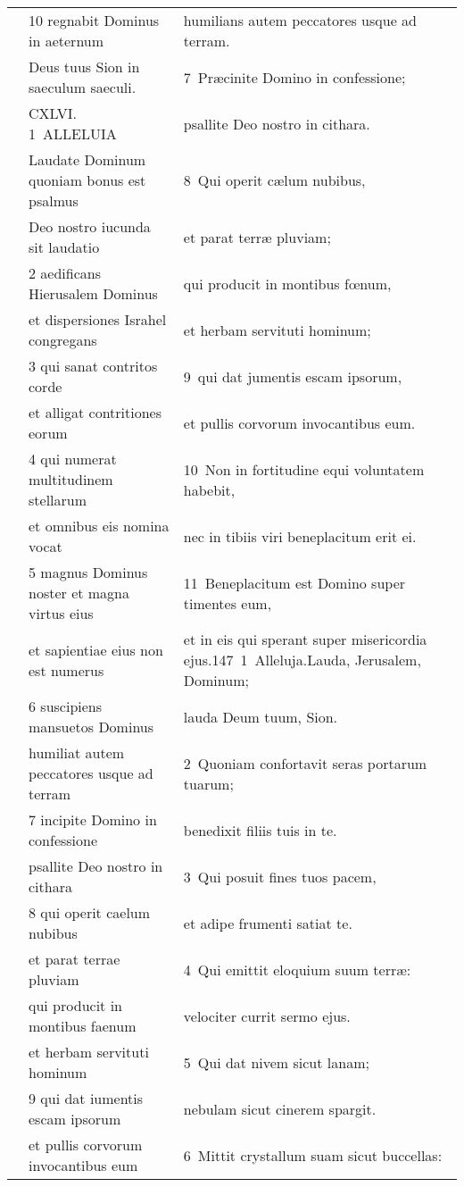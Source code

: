 \documentclass{article}
\begin{document}
\begin{longtable}{@{}p{}p{}p{}@{}}
	&	10 regnabit Dominus in aeternum	&	humilians autem peccatores usque ad terram.	\\
	&	Deus tuus Sion in saeculum saeculi.	&	7 Præcinite Domino in confessione;	\\
	&	CXLVI. 1 ALLELUIA	&	psallite Deo nostro in cithara.	\\
	&	Laudate Dominum quoniam bonus est psalmus	&	8 Qui operit cælum nubibus,	\\
	&	Deo nostro iucunda sit laudatio	&	et parat terræ pluviam;	\\
	&	2 aedificans Hierusalem Dominus	&	qui producit in montibus fœnum,	\\
	&	et dispersiones Israhel congregans	&	et herbam servituti hominum;	\\
	&	3 qui sanat contritos corde	&	9 qui dat jumentis escam ipsorum,	\\
	&	et alligat contritiones eorum	&	et pullis corvorum invocantibus eum.	\\
	&	4 qui numerat multitudinem stellarum	&	10 Non in fortitudine equi voluntatem habebit,	\\
	&	et omnibus eis nomina vocat	&	nec in tibiis viri beneplacitum erit ei.	\\
	&	5 magnus Dominus noster et magna virtus eius	&	11 Beneplacitum est Domino super timentes eum,	\\
	&	et sapientiae eius non est numerus	&	et in eis qui sperant super misericordia ejus.147 1 Alleluja.Lauda, Jerusalem, Dominum;	\\
	&	6 suscipiens mansuetos Dominus	&	lauda Deum tuum, Sion.	\\
	&	humiliat autem peccatores usque ad terram	&	2 Quoniam confortavit seras portarum tuarum;	\\
	&	7 incipite Domino in confessione	&	benedixit filiis tuis in te.	\\
	&	psallite Deo nostro in cithara	&	3 Qui posuit fines tuos pacem,	\\
	&	8 qui operit caelum nubibus	&	et adipe frumenti satiat te.	\\
	&	et parat terrae pluviam	&	4 Qui emittit eloquium suum terræ:	\\
	&	qui producit in montibus faenum	&	velociter currit sermo ejus.	\\
	&	et herbam servituti hominum	&	5 Qui dat nivem sicut lanam;	\\
	&	9 qui dat iumentis escam ipsorum	&	nebulam sicut cinerem spargit.	\\
	&	et pullis corvorum invocantibus eum	&	6 Mittit crystallum suam sicut buccellas:	\\

\end{longtable}
\end{document}
